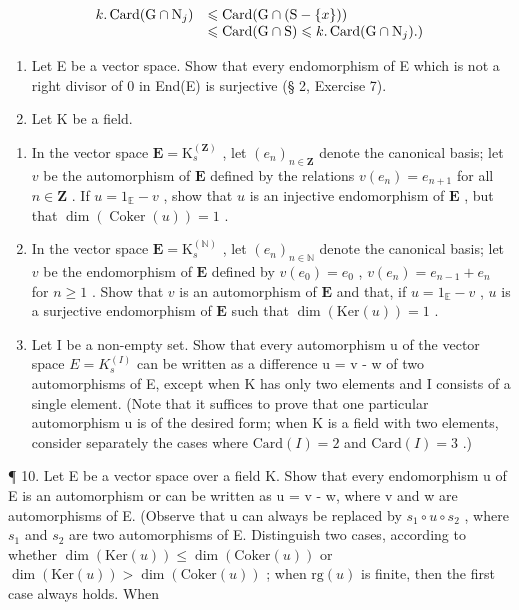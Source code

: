 \[
\begin{array}{r l} k. \operatorname{Card} (\mathrm{G} \cap \mathrm{N} _ {j}) & \leqslant \operatorname{Card} (\mathrm{G} \cap (\mathrm{S} - \{x \})) \\ & \leqslant \operatorname{Card} (\mathrm{G} \cap \mathrm{S}) \leqslant k. \operatorname{Card} (\mathrm{G} \cap \mathrm{N} _ {j}).) \end{array}
\]

\begin{enumerate}
\def\labelenumi{\arabic{enumi}.}
\setcounter{enumi}{7}
\item
  Let E be a vector space. Show that every endomorphism of E which is not a right divisor of 0 in End(E) is surjective (§ 2, Exercise 7).
\item
  Let K be a field.
\end{enumerate}

\begin{enumerate}
\def\labelenumi{(\alph{enumi})}
\item
  In the vector space \(\mathbf{E} = \mathrm{K}_s^{(\mathbf{Z})}\) , let \((e_n)_{n\in \mathbf{Z}}\) denote the canonical basis; let \(v\) be the automorphism of \(\mathbf{E}\) defined by the relations \(v(e_n) = e_{n + 1}\) for all \(n\in \mathbf{Z}\) . If \(u = 1_{\mathbb{E}} - v\) , show that \(u\) is an injective endomorphism of \(\mathbf{E}\) , but that \(\dim (\operatorname {Coker}(u)) = 1\) .
\item
  In the vector space \(\mathbf{E} = \mathrm{K}_s^{(\mathbb{N})}\) , let \((e_n)_{n\in \mathbb{N}}\) denote the canonical basis; let \(v\) be the endomorphism of \(\mathbf{E}\) defined by \(v(e_0) = e_0\) , \(v(e_n) = e_{n - 1} + e_n\) for \(n\geqslant 1\) . Show that \(v\) is an automorphism of \(\mathbf{E}\) and that, if \(u = 1_{\mathbb{E}} - v\) , \(u\) is a surjective endomorphism of \(\mathbf{E}\) such that \(\dim (\mathrm{Ker}(u)) = 1\) .
\item
  Let I be a non-empty set. Show that every automorphism u of the vector space \(E = K_{s}^{(I)}\) can be written as a difference u = v - w of two automorphisms of E, except when K has only two elements and I consists of a single element. (Note that it suffices to prove that one particular automorphism u is of the desired form; when K is a field with two elements, consider separately the cases where \(\text{Card}(I) = 2\) and \(\text{Card}(I) = 3\) .)
\end{enumerate}

¶ 10. Let E be a vector space over a field K. Show that every endomorphism u of E is an automorphism or can be written as u = v - w, where v and w are automorphisms of E. (Observe that u can always be replaced by \(s_{1} \circ u \circ s_{2}\) , where \(s_{1}\) and \(s_{2}\) are two automorphisms of E. Distinguish two cases, according to whether \(\dim(\text{Ker}(u)) \leqslant \dim(\text{Coker}(u))\) or \(\dim(\text{Ker}(u)) > \dim(\text{Coker}(u))\) ; when \(\text{rg}(u)\) is finite, then the first case always holds. When

